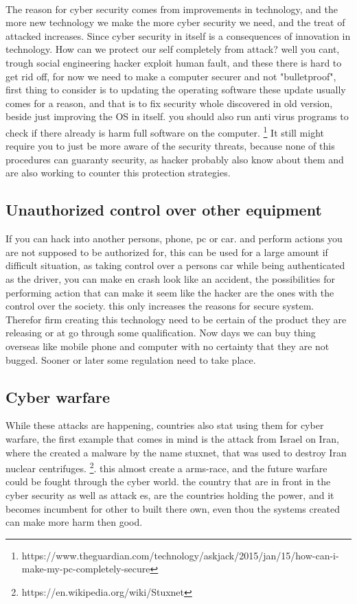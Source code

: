 \documentclass{article}
\begin{document}
\paragraph{}
The reason for cyber security comes from improvements in technology, and the more new technology we make the more cyber security we need, and the treat of attacked increases. Since cyber security in itself is a consequences of innovation in technology. How can we protect our self completely from attack? well you cant, trough social engineering hacker exploit human fault, and these there is hard to get rid off, for now we need to make a computer securer and not "bulletproof", first thing to consider is to updating the operating software these update usually comes for a reason, and that is to fix security whole discovered in old version, beside just improving the OS in itself. you should also run anti virus programs to check if there already is harm full software on the computer. \footnote{https://www.theguardian.com/technology/askjack/2015/jan/15/how-can-i-make-my-pc-completely-secure} It still might require you to just be more aware of the security threats, because none of this procedures can guaranty security, as hacker probably also know about them and are also working to counter this protection strategies.

\subsection{Unauthorized control over other equipment}
If you can hack into another persons, phone, pc or car. and perform actions you are not supposed to be authorized for, this can be used for a large amount if difficult situation, as taking control over a persons car while being authenticated as the driver, you can make en crash look like an accident, the possibilities for performing action that can make it seem like the hacker are the ones with the control over the society. this only increases the reasons for secure system. Therefor firm creating this technology need to be certain of the product they are releasing or at go through some qualification. Now days we can buy thing overseas like mobile phone and computer with no certainty that they are not bugged. Sooner or later some regulation need to take place.

\subsection{Cyber warfare}
While these attacks are happening, countries also stat using them for cyber warfare, the first example that comes in mind is the attack from Israel on Iran, where the created a malware by the name stuxnet, that was used to destroy Iran nuclear centrifuges. \footnote{https://en.wikipedia.org/wiki/Stuxnet}. this almost create a arms-race, and the future warfare could be fought through the cyber world. the country that are in front in the cyber security as well as attack es, are the countries holding the power, and it becomes incumbent for other to built there own, even thou the systems created can make more harm then good.
\end{document}

